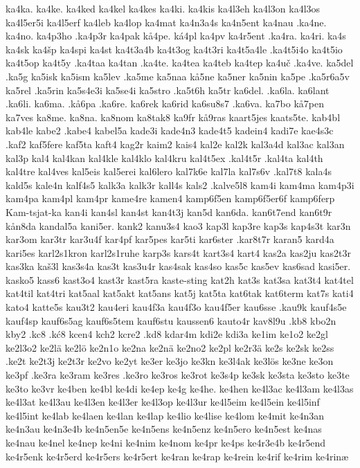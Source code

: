 {{ka4ka.
ka4ke.
ka4ked
ka4kel
ka4kes
ka4ki.
ka4kis
ka4l3eh
ka4l3on
ka4l3os
ka4l5er5i
ka4l5erf
ka4leb
ka4lop
ka4mat
ka4n3a4s
ka4n5ent
ka4nau
.ka4ne.
ka4no.
ka4p3ho
.ka4p3r
ka4pak
kå4pe.
ká4pl
ka4pv
ka4r5ent
.ka4ra.
ka4ri.
ka4s
ka4sk
ka4šp
ka4spi
ka4st
ka4t3a4b
ka4t3og
ka4t3ri
ka4t5a4le
.ka4t5i4o
ka4t5io
ka4t5op
ka4t5y
.ka4taa
ka4tan
.ka4te.
ka4tea
ka4teb
ka4tep
ka4uč
.ka4ve.
ka5del
.ka5g
ka5isk
ka5ism
ka5lev
.ka5me
ka5naa
kå5ne
ka5ner
ka5nin
ka5pe
.ka5r6a5v
ka5rel
.ka5rin
ka5s4e3i
ka5se4i
ka5stro
.ka5t6h
ka5tr
ka6del.
.ka6la.
ka6lant
.ka6li.
ka6ma.
.kå6pa
.ka6re.
ka6rek
ka6rid
ka6su8s7
.ka6va.
ka7bo
kå7pen
ka7ves
ka8me.
ka8na.
ka8nom
ka8tak8
ka9fr
kå9ras
kaart5jes
kaats5te.
kab4bl
kab4le
kabe2
.kabe4
kabel5a
kade3i
kade4n3
kade4t5
kadein4
kadi7e
kae4s3c
.kaf2
kaf5fere
kaf5ta
kaft4
kag2r
kaim2
kais4
kal2e
kal2k
kal3a4d
kal3ac
kal3an
kal3p
kal4
kal4kan
kal4kle
kal4klo
kal4kru
kal4t5ex
.kal4t5r
.kal4ta
kal4th
kal4tre
kal4ves
kal5eis
kal5erei
kal6lero
kal7k6e
kal7la
kal7s6v
.kal7t8
kala4s
kald5s
kale4n
kalf4s5
kalk3a
kalk3r
kall4s
kals2
.kalve5l8
kam4i
kam4ma
kam4p3i
kam4pa
kam4pl
kam4pr
kame4re
kamen4
kamp6f5en
kamp6f5er6f
kamp6ferp
Kam-tsjat-ka
kan4i
kan4sl
kan4st
kan4t3j
kan5d
kan6da.
kan6t7end
kan6t9r
kån8da
kandal5a
kani5er.
kank2
kanu3s4
kao3
kap3l
kap3re
kap3s
kap4s3t
kar3n
kar3om
kar3tr
kar3u4f
kar4pf
kar5pes
kar5ti
kar6ster
.kar8t7r
karan5
kard4a
kari5es
karl2s1kron
karl2s1ruhe
karp3s
kars4t
kart3s4
kart4
kas2a
kas2ju
kas2t3r
kas3ka
kaš3l
kas3s4a
kas3t
kas3u4r
kas4sak
kas4so
kas5c
kas5ev
kas6sad
kasi5er.
kasko5
kass6
kast3o4
kast3r
kast5ra
kaste-sting
kat2h
kat3s
kat3sa
kat3t4
kat4tel
kat4til
kat4tri
kat5aal
kat5akt
kat5ans
kat5j
kat5ta
kat6tak
kat6term
kat7s
kati4
kato4
katte5s
kau3t2
kau4eri
kau4f3a
kau4f3o
kau4f5er
kau6sse
.kau9k
kauf4s5e
kauf4sp
kauf6s5ag
kauf6s5tem
kauf6stu
kaussen6
kauto4r
kav8l9u
.kb8
kbo2n
kby2
.kc8
.kć8
kcen4
kch2
kcre2
.kd8
kdar4m
kdi2e
kdi3a
ke1im
ke1o2
ke2gl
ke2l3o2
ke2lä
ke2lö
ke2n1o
ke2na
ke2nä
ke2no2
ke2pl
ke2r3ä
ke2s
ke2sk
ke2ss
.ke2t
ke2t3j
ke2t3r
ke2vo
ke2yt
ke3er
ke3jo
ke3kn
ke3l4ak
ke3lös
ke3ne
ke3on
ke3pf
.ke3ra
ke3ram
ke3res
.ke3ro
ke3ros
ke3rot
ke3s4p
ke3sk
ke3sta
ke3sto
ke3te
ke3to
ke3vr
ke4ben
ke4bl
ke4di
ke4ep
ke4g
ke4he.
ke4hen
ke4l3ac
ke4l3am
ke4l3as
ke4l3at
ke4l3au
ke4l3en
ke4l3er
ke4l3op
ke4l3ur
ke4l5eim
ke4l5ein
ke4l5inf
ke4l5int
ke4lab
ke4laen
ke4lan
ke4lap
ke4lio
ke4lise
ke4lom
ke4mit
ke4n3an
ke4n3au
ke4n3e4b
ke4n5en5e
ke4n5ens
ke4n5enz
ke4n5ero
ke4n5est
ke4nas
ke4nau
ke4nel
ke4nep
ke4ni
ke4nim
ke4nom
ke4pr
ke4ps
ke4r3e4b
ke4r5end
ke4r5enk
ke4r5erd
ke4r5ers
ke4r5ert
ke4ran
ke4rap
ke4rein
ke4rif
ke4rim
ke4rinæ
}}
